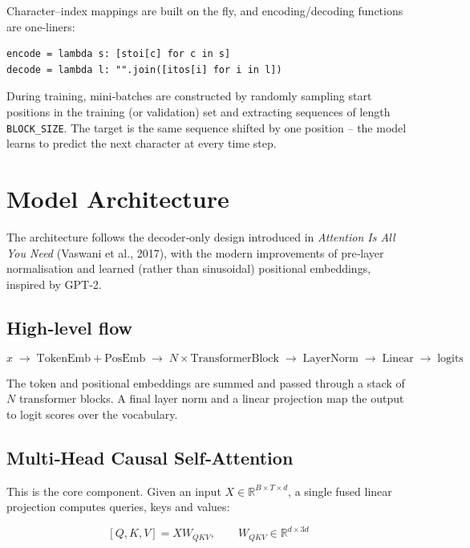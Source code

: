 \documentclass[12pt, a4paper]{article}
\begin{document}
Character–index mappings are built on the fly, and encoding/decoding functions are one‑liners:

\begin{lstlisting}
encode = lambda s: [stoi[c] for c in s]
decode = lambda l: "".join([itos[i] for i in l])
\end{lstlisting}

During training, mini‑batches are constructed by randomly sampling start positions in the training (or validation) set and extracting sequences of length \texttt{BLOCK\_SIZE}. The target is the same sequence shifted by one position – the model learns to predict the next character at every time step.

\section{Model Architecture}

The architecture follows the decoder‑only design introduced in \textit{Attention Is All You Need} (Vaswani et al., 2017), with the modern improvements of pre‑layer normalisation and learned (rather than sinusoidal) positional embeddings, inspired by GPT‑2.

\subsection{High‑level flow}

\[
  x \;\longrightarrow\; \text{TokenEmb} + \text{PosEmb}
    \;\longrightarrow\; N \times \text{TransformerBlock}
    \;\longrightarrow\; \text{LayerNorm}
    \;\longrightarrow\; \text{Linear} \;\longrightarrow\; \text{logits}
\]

The token and positional embeddings are summed and passed through a stack of $N$ transformer blocks. A final layer norm and a linear projection map the output to logit scores over the vocabulary.

\subsection{Multi‑Head Causal Self‑Attention}

This is the core component. Given an input $X \in \mathbb{R}^{B \times T \times d}$, a single fused linear projection computes queries, keys and values:

\[
  [Q, K, V] = X W_{QKV}, \qquad W_{QKV} \in \mathbb{R}^{d \times 3d}
\]
\end{document}
